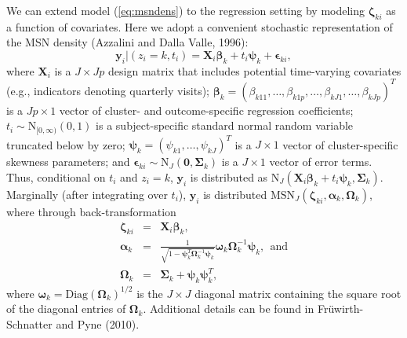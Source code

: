 \documentclass[useAMS,referee]{biom}
\begin{document}
We can extend model (\ref{eq:msndens}) to the regression setting by modeling $\boldsymbol\zeta_{ki}$ as a function of covariates. Here we adopt a convenient stochastic representation of the MSN density (Azzalini and Dalla Valle, 1996):
\begin{equation}
\mathbf{y}_{i}|(z_i=k,t_i) = \mathbf{X}_i \boldsymbol\beta_k + t_i \boldsymbol\psi_k + \boldsymbol\epsilon_{ki}, \label{eq:msnreg}
\end{equation}
where 
$\mathbf{X}_i$ is a $J \times Jp$ design matrix that includes potential time-varying covariates (e.g., indicators denoting quarterly visits); $\boldsymbol{\beta}_k=(\beta_{k11},\ldots,\beta_{k1p},\ldots,\beta_{kJ1},\ldots,\beta_{kJp})^T$ is a $Jp\times 1$ vector of cluster- and outcome-specific regression coefficients; $t_i\sim \text{N}_{[0,\infty)}(0,1)$ is a subject-specific standard normal random variable truncated below by zero; $\boldsymbol\psi_k=(\psi_{k1},\ldots,\psi_{kJ})^T$ is a $J \times 1$ vector of cluster-specific skewness parameters; and $\boldsymbol{\epsilon}_{ki} \sim \text{N}_J(\boldsymbol0,\boldsymbol\Sigma_k)$ is a $J\times 1$ vector of error terms. Thus, conditional on $t_i$ and $z_i=k$, $\boldsymbol{y}_i$ is distributed as $\text{N}_J(\mathbf{X}_i \boldsymbol\beta_k + t_i \boldsymbol\psi_k, \boldsymbol{\Sigma}_k)$. Marginally (after integrating over $t_i$), $\mathbf{y}_i$ is distributed $\text{MSN}_J(\boldsymbol\zeta_{ki}, \boldsymbol\alpha_k, \boldsymbol\Omega_k)$, where through back-transformation 
\begin{eqnarray*}
\boldsymbol\zeta_{ki} &=& \mathbf{X}_i\boldsymbol\beta_k,\\
\boldsymbol\alpha_k &=& \frac{1}{\sqrt{1 - \boldsymbol\psi_k^T 
\boldsymbol\Omega^{-1}_k\boldsymbol\psi_k}} \boldsymbol\omega_k \boldsymbol\Omega^{-1}_k\boldsymbol\psi_k,~~\text{and}\\
\boldsymbol\Omega_k &=& \boldsymbol\Sigma_k  + \boldsymbol\psi_k \boldsymbol\psi_k^T,
\end{eqnarray*}
where $\boldsymbol\omega_k = \text{Diag}(\boldsymbol\Omega_k)^{1/2}$ is the $J \times J$ diagonal matrix containing the square root of the diagonal entries of $\boldsymbol\Omega_k$. Additional details can be found in Fr\"{u}wirth-Schnatter and Pyne (2010). 
\end{document}
